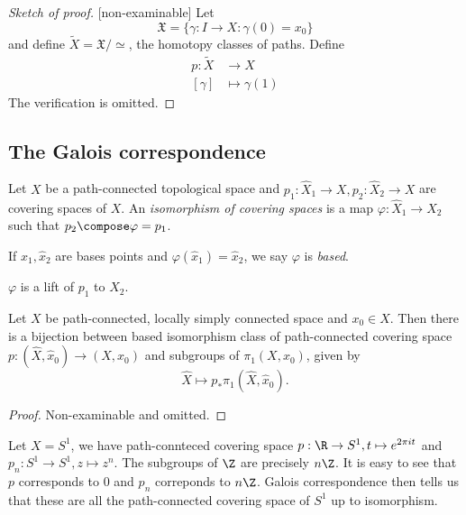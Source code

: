 \documentclass[a4paper]{article}
\begin{document}
\begin{proof}[Sketch of proof][non-examinable]
  Let
  \[
    \mathfrak X = \{\gamma: I \to X: \gamma(0) = x_0\}
  \]
  and define \(\tilde X = \mathfrak X /\simeq\), the homotopy classes of paths. Define
  \begin{align*}
    p: \tilde X &\to X \\
    [\gamma] &\mapsto \gamma(1)
  \end{align*}
  The verification is omitted.
\end{proof}

\subsection{The Galois correspondence}

\begin{definition}
  Let \(X\) be a path-connected topological space and \(p_1: \hat X_1 \to X, p_2: \hat X_2 \to X\) are covering spaces of \(X\). An \emph{isomorphism of covering spaces} is a map \(\varphi: \hat X_1 \to \hat X_2\) such that \(p_2 \compose \varphi = p_1\).

  If \(\hat x_1, \hat x_2\) are bases points and \(\varphi(\hat x_1) = \hat x_2\), we say \(\varphi\) is \emph{based}.
\end{definition}

\begin{remark}
  \(\varphi\) is a lift of \(p_1\) to \(\hat X_2\).
\end{remark}

\begin{theorem}
  Let \(X\) be path-connected, locally simply connected space and \(x_0 \in X\). Then there is a bijection between based isomorphism class of path-connected covering space \(p: (\hat X, \hat x_0) \to (X, x_0)\) and subgroups of \(\pi_1(X,x_0)\), given by
  \[
    \hat X \mapsto p_*\pi_1(\hat X, \hat x_0).
  \]
\end{theorem}

\begin{proof}
  Non-examinable and omitted.
\end{proof}

\begin{eg}
  Let \(X = S^1\), we have path-connteced covering space \(p: \R \to S^1, t \mapsto e^{2\pi it}\) and \(p_n: S^1 \to S^1, z \mapsto z^n\). The subgroups of \(\Z\) are precisely \(n\Z\). It is easy to see that \(p\) corresponds to \(0\) and \(p_n\) correponds to \(n\Z\). Galois correspondence then tells us that these are all the path-connected covering space of \(S^1\) up to isomorphism.
\end{eg}
\end{document}
